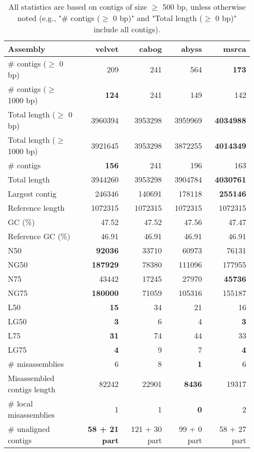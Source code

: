 \documentclass[12pt,a4paper]{article}
\begin{document}
\begin{table}[ht]
\begin{center}
\caption{All statistics are based on contigs of size $\geq$ 500 bp, unless otherwise noted (e.g., "\# contigs ($\geq$ 0 bp)" and "Total length ($\geq$ 0 bp)" include all contigs).}
\begin{tabular}{|l*{4}{|r}|}
\hline
Assembly & velvet & cabog & abyss & msrca \\ \hline
\# contigs ($\geq$ 0 bp) & 209 & 241 & 564 & {\bf 173} \\ \hline
\# contigs ($\geq$ 1000 bp) & {\bf 124} & 241 & 149 & 142 \\ \hline
Total length ($\geq$ 0 bp) & 3960394 & 3953298 & 3959969 & {\bf 4034988} \\ \hline
Total length ($\geq$ 1000 bp) & 3921645 & 3953298 & 3872255 & {\bf 4014349} \\ \hline
\# contigs & {\bf 156} & 241 & 196 & 163 \\ \hline
Total length & 3944260 & 3953298 & 3904784 & {\bf 4030761} \\ \hline
Largest contig & 246346 & 140691 & 178118 & {\bf 255146} \\ \hline
Reference length & 1072315 & 1072315 & 1072315 & 1072315 \\ \hline
GC (\%) & 47.52 & 47.52 & 47.56 & 47.47 \\ \hline
Reference GC (\%) & 46.91 & 46.91 & 46.91 & 46.91 \\ \hline
N50 & {\bf 92036} & 33710 & 60973 & 76131 \\ \hline
NG50 & {\bf 187929} & 78380 & 111096 & 177955 \\ \hline
N75 & 43442 & 17245 & 27970 & {\bf 45736} \\ \hline
NG75 & {\bf 180000} & 71059 & 105316 & 155187 \\ \hline
L50 & {\bf 15} & 34 & 21 & 16 \\ \hline
LG50 & {\bf 3} & 6 & 4 & {\bf 3} \\ \hline
L75 & {\bf 31} & 74 & 44 & 33 \\ \hline
LG75 & {\bf 4} & 9 & 7 & {\bf 4} \\ \hline
\# misassemblies & 6 & 8 & {\bf 1} & 6 \\ \hline
Misassembled contigs length & 82242 & 22901 & {\bf 8436} & 19317 \\ \hline
\# local misassemblies & 1 & 1 & {\bf 0} & 2 \\ \hline
\# unaligned contigs & {\bf 58 + 21 part} & 121 + 30 part & 99 + 0 part & 58 + 27 part \\ \hline

\end{tabular}
\end{center}
\end{table}
\end{document}
